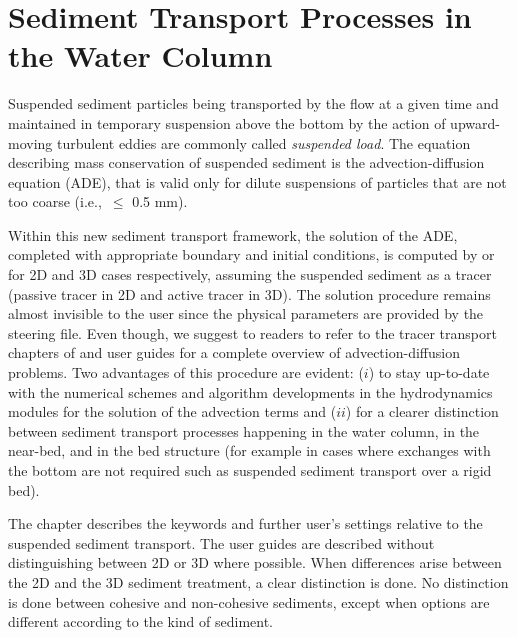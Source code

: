 \chapter[Sediment Transport Processes in the Water Column]{Sediment Transport Processes in the Water Column}
\label{chap:SuspendedSedimentTransport}

Suspended sediment particles being transported by the flow at a given time and maintained in temporary suspension above the bottom by the action of upward-moving turbulent eddies are commonly called \textit{suspended load}. The equation describing mass conservation of suspended sediment is the advection-diffusion equation (ADE), that is valid only for dilute suspensions of particles that are not too coarse (i.e.,~$\leq$ 0.5 mm).

Within this new sediment transport framework, the solution of the ADE, completed with appropriate boundary and initial conditions, is computed by  or  for 2D and 3D cases respectively, assuming the suspended sediment as a tracer (passive tracer in 2D and active tracer in 3D). The solution procedure remains almost invisible to the user since the physical parameters are provided by the \gaia{} steering file. Even though, we suggest to readers to refer to the tracer transport chapters of  and  user guides for a complete overview of advection-diffusion problems. Two advantages of this procedure are evident: ($i$) to stay up-to-date with the numerical schemes and algorithm developments in the hydrodynamics modules for the solution of the advection terms and ($ii$) for a clearer distinction between sediment transport processes happening in the water column, in the near-bed, and in the bed structure (for example in cases where exchanges with the bottom are not required such as suspended sediment transport over a rigid bed).

The chapter describes the keywords and further user's settings relative to the
suspended sediment transport. The user guides are described without
distinguishing between 2D or 3D where possible. When differences arise between
the 2D and the 3D sediment treatment, a clear distinction is done. No distinction
is done between cohesive and non-cohesive sediments, except when options are
different according to the kind of sediment.


